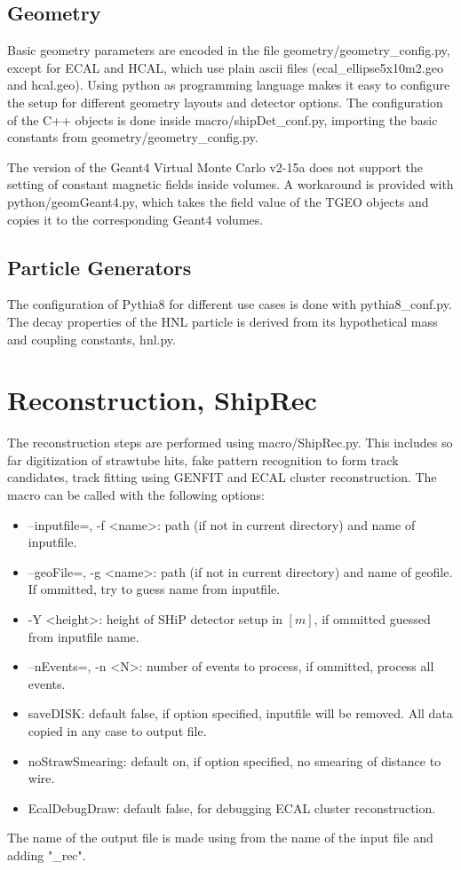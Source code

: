 \documentclass[12pt,a4paper]{article}
\begin{document}
\subsection{Geometry}
Basic geometry parameters are encoded in the file geometry/geometry\_config.py, except for ECAL and HCAL, which use plain ascii files (ecal\_ellipse5x10m2.geo and hcal.geo). Using python as programming language makes it easy to configure the setup for different geometry layouts and detector options. The configuration of the C++ objects is done inside macro/shipDet\_conf.py, importing the basic constants from geometry/geometry\_config.py. 

The version of the Geant4 Virtual Monte Carlo v2-15a does not support the setting of constant magnetic fields inside volumes. A workaround is provided with   
python/geomGeant4.py, which takes the field value of the TGEO objects and copies it to the corresponding Geant4 volumes.    
 
\subsection{Particle Generators}
The configuration of Pythia8 for different use cases is done with pythia8\_conf.py. The decay properties of the HNL particle is derived from its hypothetical mass and coupling constants, hnl.py.

\section{Reconstruction, ShipRec}
The reconstruction steps are performed using macro/ShipRec.py. This includes so far digitization of strawtube hits, fake pattern recognition to form track candidates, track fitting using GENFIT and ECAL cluster reconstruction. The macro can be called with the following options:

\begin{itemize}
\item --inputfile=, -f \textless name\textgreater : path (if not in current directory) and name of inputfile.
\item --geoFile=,   -g \textless name\textgreater : path (if not in current directory) and name of geofile. If ommitted, try to guess name from inputfile.
\item -Y \textless height\textgreater             : height of SHiP detector setup in $[m]$, if ommitted guessed from inputfile name. 
\item --nEvents=, -n  \textless N\textgreater      : number of events to process, if ommitted, process all events.
\item saveDISK:  default false, if option specified, inputfile will be removed. All data copied in any case to output file.
\item noStrawSmearing:  default on, if option specified, no smearing of distance to wire. 
\item EcalDebugDraw:  default false, for debugging ECAL cluster reconstruction. 
\end{itemize}
The name of the output file is made using from the name of the input file and adding "\_rec". 
\end{document}
